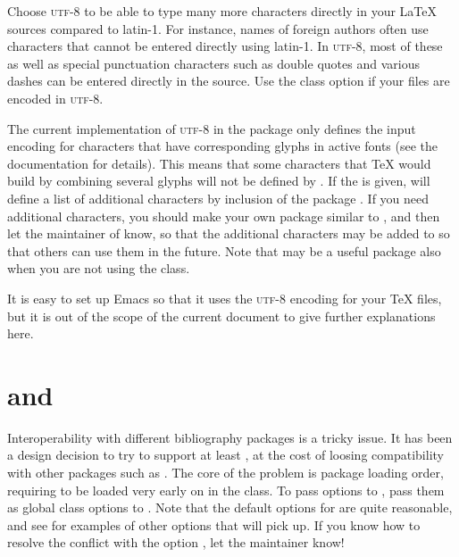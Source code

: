 Choose \mbox{\textsc{utf}-8} to be able to type many more characters directly in your \LaTeX{} sources compared to \mbox{latin-1}.  For instance, names of foreign authors often use characters that cannot be entered directly using \mbox{latin-1}.  In \mbox{\textsc{utf}-8}, most of these as well as special punctuation characters such as double quotes and various dashes can be entered directly in the source.  Use the  class option if your files are encoded in \mbox{\textsc{utf}-8}.

The current implementation of \mbox{\textsc{utf}-8} in the  package only defines the input encoding for characters that have corresponding glyphs in active fonts (see the  documentation for details).  This means that some characters that \TeX{} would build by combining several glyphs will not be defined by .  If the  is given, \rtthesis will define a list of additional characters by inclusion of the package .  If you need additional characters, you should make your own package similar to , and then let the maintainer of \rtthesis know, so that the additional characters may be added to  so that others can use them in the future.  Note that  may be a useful package also when you are not using the \rtthesis class.

It is easy to set up Emacs so that it uses the \mbox{\textsc{utf}-8} encoding for your \TeX{} files, but it is out of the scope of the current document to give further explanations here.


\section{\rtthesis and }
%
Interoperability with different bibliography packages is a tricky issue.  It has been a design decision to try to support at least , at the cost of loosing compatibility with other packages such as .  The core of the problem is package loading order, requiring  to be loaded very early on in the class.  To pass options to , pass them as global class options to \rtthesis.  Note that the default options for  are quite reasonable, and see  for examples of other options that  will pick up.  If you know how to resolve the conflict with the  option , let the \rtthesis maintainer know!

